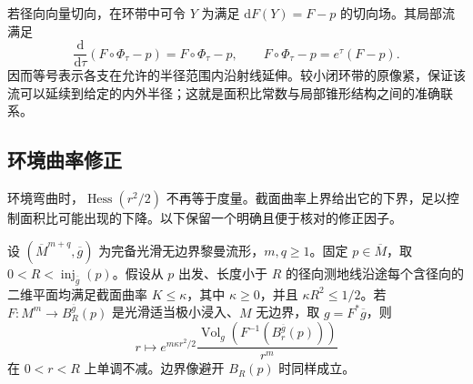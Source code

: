 若径向向量切向，在环带中可令 \(Y\) 为满足 \(\mathrm dF(Y)=F-p\) 的切向场。其局部流满足
\[
	\frac{\mathrm d}{\mathrm d\tau}(F\circ\Phi_\tau-p)
	=F\circ\Phi_\tau-p,
	\qquad F\circ\Phi_\tau-p=e^\tau(F-p).
\]
因而等号表示各支在允许的半径范围内沿射线延伸。较小闭环带的原像紧，保证该流可以延续到给定的内外半径；这就是面积比常数与局部锥形结构之间的准确联系。

\subsection{环境曲率修正}
\label{g3:subsec:1903:02}
环境弯曲时，\(\operatorname{Hess}(r^2/2)\) 不再等于度量。截面曲率上界给出它的下界，足以控制面积比可能出现的下降。以下保留一个明确且便于核对的修正因子。

\begin{theorem}\label{g3:thm:curvature-corrected-area-monotonicity}
	设 \((\overline M^{m+q},\overline g)\) 为完备光滑无边界黎曼流形，\(m,q\ge1\)。固定 \(p\in\overline M\)，取 \(0<R<\operatorname{inj}_{\overline g}(p)\)。假设从 \(p\) 出发、长度小于 \(R\) 的径向测地线沿途每个含径向的二维平面均满足截面曲率 \(K\le\kappa\)，其中 \(\kappa\ge0\)，并且 \(\kappa R^2\le1/2\)。若 \(F:M^m\to B_R^{\overline g}(p)\) 是光滑适当极小浸入、\(M\) 无边界，取 \(g=F^*\overline g\)，则
	\begin{equation}\label{g3:eq:curved-minimal-area-ratio}
		r\longmapsto
		e^{m\kappa r^2/2}\frac{\operatorname{Vol}_g(F^{-1}(B_r^{\overline g}(p)))}{r^m}
	\end{equation}
	在 \(0<r<R\) 上单调不减。边界像避开 \(B_R(p)\) 时同样成立。
\end{theorem}
